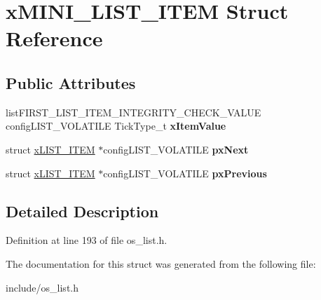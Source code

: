 \hypertarget{structxMINI__LIST__ITEM}{}\section{x\+M\+I\+N\+I\+\_\+\+L\+I\+S\+T\+\_\+\+I\+T\+EM Struct Reference}
\label{structxMINI__LIST__ITEM}
\subsection*{Public Attributes}
\begin{DoxyCompactItemize}
\item 
\mbox{\label{structxMINI__LIST__ITEM_aae79c54ac1efa30959e68604cc23b29e}} 
list\+F\+I\+R\+S\+T\+\_\+\+L\+I\+S\+T\+\_\+\+I\+T\+E\+M\+\_\+\+I\+N\+T\+E\+G\+R\+I\+T\+Y\+\_\+\+C\+H\+E\+C\+K\+\_\+\+V\+A\+L\+UE config\+L\+I\+S\+T\+\_\+\+V\+O\+L\+A\+T\+I\+LE Tick\+Type\+\_\+t {\bfseries x\+Item\+Value}
\item 
\mbox{\label{structxMINI__LIST__ITEM_aa7ae770b0f10daeb9ac76c6f7dd5608e}} 
struct \mbox{\hyperlink{structxLIST__ITEM}{x\+L\+I\+S\+T\+\_\+\+I\+T\+EM}} $\ast$config\+L\+I\+S\+T\+\_\+\+V\+O\+L\+A\+T\+I\+LE {\bfseries px\+Next}
\item 
\mbox{\label{structxMINI__LIST__ITEM_a732c666bb97560eb1b094a2c411269ab}} 
struct \mbox{\hyperlink{structxLIST__ITEM}{x\+L\+I\+S\+T\+\_\+\+I\+T\+EM}} $\ast$config\+L\+I\+S\+T\+\_\+\+V\+O\+L\+A\+T\+I\+LE {\bfseries px\+Previous}
\end{DoxyCompactItemize}


\subsection{Detailed Description}


Definition at line 193 of file os\+\_\+list.\+h.



The documentation for this struct was generated from the following file\+:\begin{DoxyCompactItemize}
\item 
include/os\+\_\+list.\+h\end{DoxyCompactItemize}
